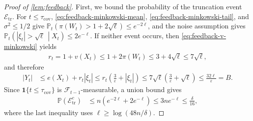 \documentclass[11pt]{article}
\newcommand{\Pp}{\mathbb P}
\newcommand{\F}{\mathcal F}
\newcommand{\1}{\mathbf 1}
\newcommand{\eps}{\varepsilon}
\begin{document}
\begin{proof}[Proof of \cref{lem:feedback}]
    First, we bound the probability of the truncation event $\mathcal E_{\mathrm{tr}}$.
    For $t\leq\tau_{\mathrm{cov}}$,
    \eqref{eq:feedback-minkowski-mean},
    \eqref{eq:feedback-minkowski-tail}, and
    $\sigma^2\leq1/2$ give
    $\Pp_t\left(
        \pi(W_t)>1+2\sqrt\ell
        \right)
        \leq e^{-2\ell}$,
    and the noise assumption gives
    $\Pp_t\left(
        |\xi_t|>\sqrt\ell
        \,\middle|X_t
        \right)
        \leq
        2e^{-\ell}$.
    If neither event occurs, then
    \eqref{eq:feedback-v-minkowski} yields
    \begin{align}
        r_t
        =1+v(X_t)
        \leq
        1+2\pi(W_t)
        \leq
        3+4\sqrt\ell
        \leq
        7\sqrt\ell,
    \end{align}
    and therefore
    \begin{align}
        |Y_t|
         & \leq
        e(X_t)+r_t|\xi_t|
        \leq
        r_t\left(\frac3\eps+|\xi_t|\right)
        \leq
        7\sqrt\ell
        \left(
        \frac3\eps+\sqrt\ell
        \right)
        \leq
        \frac{32\ell}{\eps}
        =B.
    \end{align}
    Since $\1\{t\leq\tau_{\mathrm{cov}}\}$ is
    $\F_{t-1}$-measurable, a union bound gives
    \begin{align}
        \Pp(\mathcal E_{\mathrm{tr}}^c)
         & \leq
        n\left(e^{-2\ell}+2e^{-\ell}\right)
        \leq
        3ne^{-\ell}
        \leq
        \frac{\delta}{16},
        \label{eq:feedback-truncation-event}
    \end{align}
    where the last inequality uses
    $\ell\geq\log(48n/\delta)$.


\end{proof}
\end{document}

